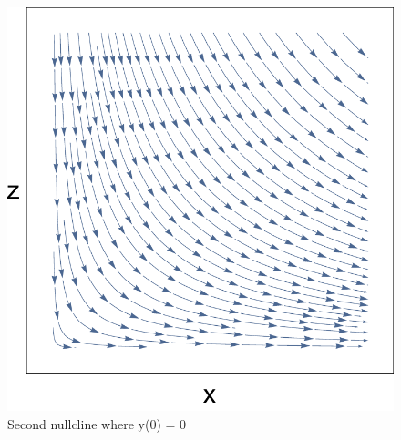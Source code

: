 \documentclass[11pt,oneside]{article}
\begin{document}
	\begin{figure}[H]
		\center
		\includegraphics[scale=0.5]{XZ}
		\caption{Second nullcline where y(0) = 0}
	\end{figure}
	
	
\end{document}
